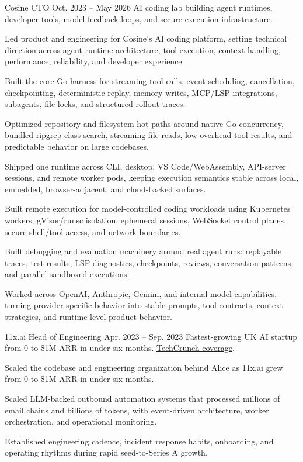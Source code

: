 
\ResumeJob
  {Cosine}
  {CTO}
  {Oct. 2023 -- May 2026}
  {AI coding lab building agent runtimes, developer tools, model feedback loops, and secure execution infrastructure.}
\begin{ResumeList}
  \item Led product and engineering for Cosine's AI coding platform, setting technical direction across agent runtime architecture, tool execution, context handling, performance, reliability, and developer experience.
  \item Built the core Go harness for streaming tool calls, event scheduling, cancellation, checkpointing, deterministic replay, memory writes, MCP/LSP integrations, subagents, file locks, and structured rollout traces.
  \item Optimized repository and filesystem hot paths around native Go concurrency, bundled ripgrep-class search, streaming file reads, low-overhead tool results, and predictable behavior on large codebases.
  \item Shipped one runtime across CLI, desktop, VS Code/WebAssembly, API-server sessions, and remote worker pods, keeping execution semantics stable across local, embedded, browser-adjacent, and cloud-backed surfaces.
  \item Built remote execution for model-controlled coding workloads using Kubernetes workers, gVisor/runsc isolation, ephemeral sessions, WebSocket control planes, secure shell/tool access, and network boundaries.
  \item Built debugging and evaluation machinery around real agent runs: replayable traces, test results, LSP diagnostics, checkpoints, reviews, conversation patterns, and parallel sandboxed executions.
  \item Worked across OpenAI, Anthropic, Gemini, and internal model capabilities, turning provider-specific behavior into stable prompts, tool contracts, context strategies, and runtime-level product behavior.
\end{ResumeList}

\ResumeJob
  {11x.ai}
  {Head of Engineering}
  {Apr. 2023 -- Sep. 2023}
  {Fastest-growing UK AI startup from 0 to \$1M ARR in under six months. \href{https://techcrunch.com/2023/08/11/11xai-closes-2-million-pre-seed-to-create-autonomous-ai-workers/}{TechCrunch coverage}.}
\begin{ResumeList}
  \item Scaled the codebase and engineering organization behind Alice as 11x.ai grew from 0 to \$1M ARR in under six months.
  \item Scaled LLM-backed outbound automation systems that processed millions of email chains and billions of tokens, with event-driven architecture, worker orchestration, and operational monitoring.
  \item Established engineering cadence, incident response habits, onboarding, and operating rhythms during rapid seed-to-Series A growth.
\end{ResumeList}

